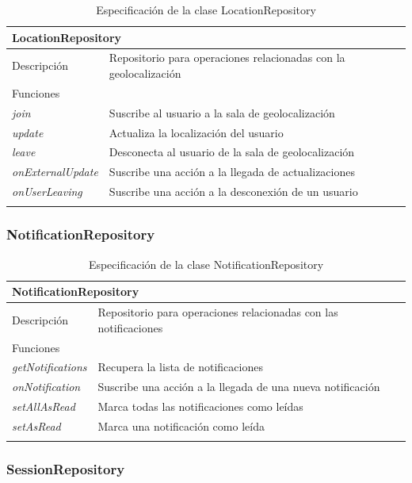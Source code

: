\begin{longtable}{|p{} p{}|}
    \hline
    \multicolumn{2}{|l|}{LocationRepository} \\ \hline \hline
    Descripción      & Repositorio para operaciones relacionadas con la geolocalización \\ \hline
    \multicolumn{2}{|l|}{Funciones} \\
    \emph{join}  & Suscribe al usuario a la sala de geolocalización \\
    \emph{update}  & Actualiza la localización del usuario \\
    \emph{leave}  & Desconecta al usuario de la sala de geolocalización \\
    \emph{onExternalUpdate}  & Suscribe una acción a la llegada de actualizaciones \\
    \emph{onUserLeaving}  & Suscribe una acción a la desconexión de un usuario \\ \hline
    \caption{Especificación de la clase LocationRepository}
    \label{class:app:location_repository}
\end{longtable}

\subsubsection{NotificationRepository}

\begin{longtable}{|p{} p{}|}
    \hline
    \multicolumn{2}{|l|}{NotificationRepository} \\ \hline \hline
    Descripción      & Repositorio para operaciones relacionadas con las notificaciones \\ \hline
    \multicolumn{2}{|l|}{Funciones} \\
    \emph{getNotifications}  & Recupera la lista de notificaciones \\
    \emph{onNotification}  & Suscribe una acción a la llegada de una nueva notificación \\
    \emph{setAllAsRead}  & Marca todas las notificaciones como leídas \\
    \emph{setAsRead}  & Marca una notificación como leída \\ \hline
    \caption{Especificación de la clase NotificationRepository}
    \label{class:app:notification_repository}
\end{longtable}

\subsubsection{SessionRepository}


